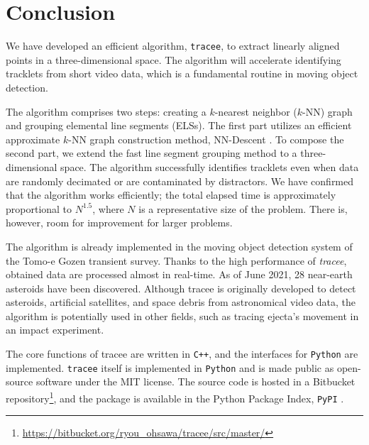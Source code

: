
\section{Conclusion}
\label{sec:conclusion}

We have developed an efficient algorithm, \texttt{tracee}, to extract linearly aligned points in a three-dimensional space. The algorithm will accelerate identifying tracklets from short video data, which is a fundamental routine in moving object detection.

The algorithm comprises two steps: creating a $k$-nearest neighbor ($k$-NN) graph and grouping elemental line segments (ELSs). The first part utilizes an efficient approximate $k$-NN graph construction method, NN-Descent \citep{dong_efficient_2011}. To compose the second part, we extend the fast line segment grouping method \citep{jang_fast_2002} to a three-dimensional space. The algorithm successfully identifies tracklets even when data are randomly decimated or are contaminated by distractors. We have confirmed that the algorithm works efficiently; the total elapsed time is approximately proportional to $N^{1.5}$, where $N$ is a representative size of the problem. There is, however, room for improvement for larger problems.

The algorithm is already implemented in the moving object detection system of the Tomo-e Gozen transient survey. Thanks to the high performance of \textit{tracee}, obtained data are processed almost in real-time. As of June 2021, 28 near-earth asteroids have been discovered. Although tracee is originally developed to detect asteroids, artificial satellites, and space debris from astronomical video data, the algorithm is potentially used in other fields, such as tracing ejecta's movement in an impact experiment.

The core functions of tracee are written in \texttt{C++}, and the interfaces for \texttt{Python} are implemented. \texttt{tracee} itself is implemented in \texttt{Python} and is made public as open-source software under the MIT license. The source code is hosted in a Bitbucket repository\footnote{\url{https://bitbucket.org/ryou_ohsawa/tracee/src/master/}}, and the package is available in the Python Package Index, \texttt{PyPI} \citep{ohsawa_tracee_2021}.

